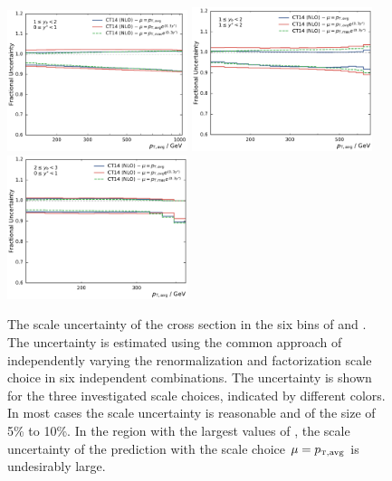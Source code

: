 \begin{figure}[htp]
    \includegraphics[width=0.47\textwidth]{figures/theory/scale_uncert_comp_yb1ys0.pdf}
    \includegraphics[width=0.47\textwidth]{figures/theory/scale_uncert_comp_yb1ys1.pdf}\hfill
    \includegraphics[width=0.47\textwidth]{figures/theory/scale_uncert_comp_yb2ys0.pdf}
    \caption[Scale Uncertainties of NLO calculation]{The scale uncertainty of
        the cross section in the six bins of \ystar and
        \yboost. The uncertainty is estimated using the common approach of
        independently varying the renormalization and factorization scale choice
        in six independent combinations. The uncertainty is shown for the three
        investigated scale choices, indicated by different colors. In most cases
        the scale uncertainty is reasonable and of the size of 5\% to 10\%. In
        the region with the largest values of \ystar, the scale uncertainty of
        the prediction with the scale choice $\mu=\ptavg$ is undesirably large.}
    \label{fig:scale_uncertainties}
\end{figure}


